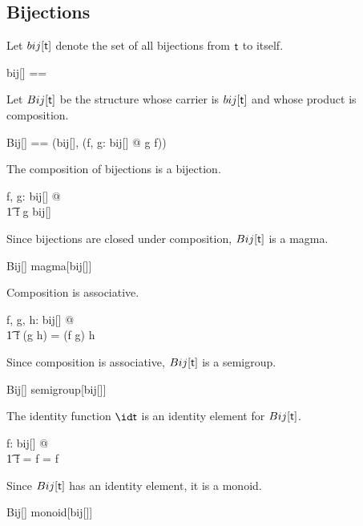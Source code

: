 \documentclass{amsart}
\begin{document}
\subsection{Bijections}

Let $bij[\mathsf{t}]$ denote the set of all bijections from $\mathsf{t}$ to itself.

\begin{zed}
	bij[\genT] == \genT \bij \genT
\end{zed}

Let $Bij[\mathsf{t}]$ be the structure whose carrier is $bij[\mathsf{t}]$ and
whose product is composition.

\begin{zed}
	Bij[\genT] == (bij[\genT], (\lambda f, g: bij[\genT] @ g \circ f))
\end{zed}

\begin{remark}
The composition of bijections is a bijection.

\begin{zed}
	\forall f, g: bij[\setT] @ \\
	\t1	f \circ g \in bij[\setT]
\end{zed}

Since bijections are closed under composition, $Bij[\mathsf{t}]$ is a magma.

\begin{zed}
	Bij[\setT] \in magma[bij[\setT]]
\end{zed}
	
\end{remark}

\begin{remark}
Composition is associative.

\begin{zed}
	\forall f, g, h: bij[\setT] @ \\
	\t1	f \circ (g \circ h) = (f \circ g) \circ h
\end{zed}

Since composition is associative, $Bij[\mathsf{t}]$ is a semigroup.

\begin{zed}
	Bij[\setT] \in semigroup[bij[\setT]]
\end{zed}

\end{remark}

\begin{remark}
The identity function $\id \genT$ is an identity element for $Bij[\mathsf{t}]$.

\begin{zed}
	\forall f: bij[\setT] @ \\
	\t1	 \id \setT \circ f = f = f \circ \id \setT
\end{zed}

Since $Bij[\mathsf{t}]$ has an identity element, it is a monoid.

\begin{zed}
	Bij[\setT] \in monoid[bij[\setT]]
\end{zed}

\end{remark}
\end{document}
